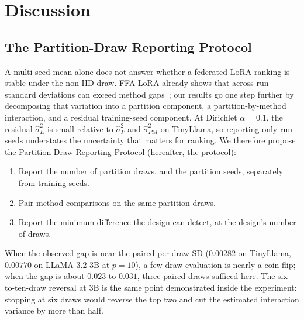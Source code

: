 \section{Discussion}
\label{sec:discussion}

\subsection{The Partition-Draw Reporting Protocol}
A multi-seed mean alone does not answer whether a federated LoRA ranking is stable under the non-IID draw. FFA-LoRA already shows that across-run standard deviations can exceed method gaps~\cite{sun2024ffalora}; our results go one step further by decomposing that variation into a partition component, a partition-by-method interaction, and a residual training-seed component. At Dirichlet $\alpha{=}0.1$, the residual $\hat\sigma^2_E$ is small relative to $\hat\sigma^2_P$ and $\hat\sigma^2_{PM}$ on TinyLlama, so reporting only run seeds understates the uncertainty that matters for ranking. We therefore propose the Partition-Draw Reporting Protocol (hereafter, the protocol):
\begin{enumerate}
\item Report the number of partition draws, and the partition seeds, separately from training seeds.
\item Pair method comparisons on the same partition draws.
\item Report the minimum difference the design can detect, at the design's number of draws.
\end{enumerate}
When the observed gap is near the paired per-draw SD ($0.00282$ on TinyLlama, $0.00770$ on LLaMA-3.2-3B at $p{=}10$), a few-draw evaluation is nearly a coin flip; when the gap is about $0.023$ to $0.031$, three paired draws sufficed here. The six-to-ten-draw reversal at 3B is the same point demonstrated inside the experiment: stopping at six draws would reverse the top two and cut the estimated interaction variance by more than half.


